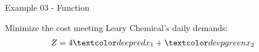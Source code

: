 \begin{frame}{Example 03 - Function}

Minimize the cost meeting Leary Chemical's daily demands:
\begin{align*}
    Z &= 4\colora{x_1} + \colorb{x_2}
\end{align*}

\end{frame}
